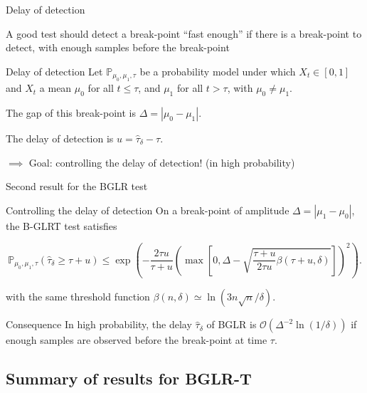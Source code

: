 \documentclass[11pt,english,ignorenonframetext,]{beamer}
\begin{document}
\begin{frame}{Delay of detection}

  A good test should detect a break-point ``fast enough'' if there is a break-point to detect, with enough samples before the break-point

  \begin{block}{Delay of detection}
    Let $\mathbb{P}_{\mu_0,\mu_1,\tau}$ be a probability model under which $X_t \in[0,1]$ and $X_t$ a mean $\mu_0$ for all $t \leq \tau$, and $\mu_1$ for all $t > \tau$,
    with $\mu_0 \neq \mu_1$.

    The \alert{gap} of this break-point is $\Delta = |\mu_0 - \mu_1|$.

    The \alert{delay of detection} is $u = \widehat{\tau}_{\delta} - \tau$.
  \end{block}

  \alert{$\implies$ Goal: controlling the delay of detection!} (in high probability)

\end{frame}

\begin{frame}{Second result for the BGLR test}

  \begin{block}{Controlling the delay of detection}
      On a break-point of amplitude $\Delta = |\mu_1 - \mu_0|$,
      the B-GLRT test satisfies
      \begin{small}
      \[ \mathbb{P}_{\mu_0,\mu_1,\tau} (\widehat{\tau}_{\delta} \geq \tau + u) \leq \exp\left( -\frac{2\tau u}{\tau + u}\left(\max\left[ 0, \Delta - \sqrt{\frac{\tau + u}{2\tau u} \beta(\tau + u,\delta)} \right]\right)^2 \right). \]
      \end{small}
      with the same threshold function
      $\beta(n,\delta) \simeq \ln(3n \sqrt{n}/\delta)$.
  \end{block}

  \begin{exampleblock}{Consequence}
    In high probability, the delay $\widehat{\tau}_\delta$ of BGLR is $\mathcal{O}(\Delta^{-2} \ln(1/\delta))$ if enough samples are observed before the break-point at time $\tau$.
  \end{exampleblock}

\end{frame}


\subsection{\hfill{}Summary of results for BGLR-T\hfill{}}
\end{document}

